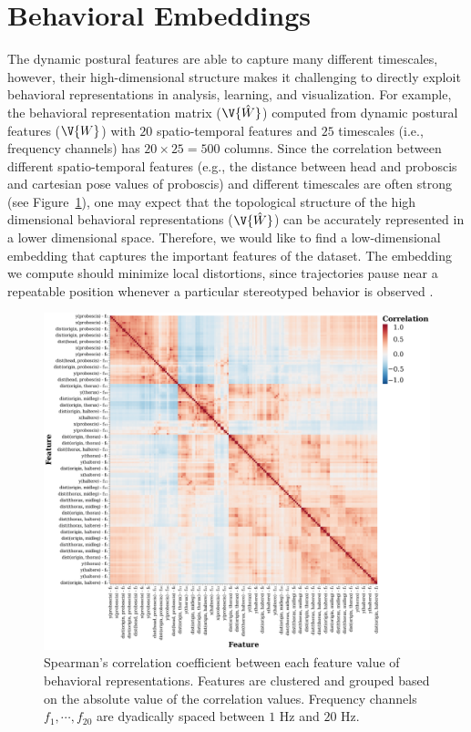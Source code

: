 \section{Behavioral Embeddings}\label{section:behavioral-embeddings}
The dynamic postural features are able to capture many different timescales, however, their high-dimensional structure makes it challenging to directly exploit behavioral representations in analysis, learning, and visualization.
For example, the behavioral representation matrix ($\V{\hat{W}}$) computed from dynamic postural features ($\V{W}$) with $20$ spatio-temporal features and $25$ timescales (i.e., frequency channels) has $20 \times 25 {=} 500$ columns.
Since the correlation between different spatio-temporal features (e.g., the distance between head and proboscis and cartesian pose values of proboscis) and different timescales are often strong (see Figure~\ref{figure:correlations-btw-features}), one may expect that the topological structure of the high dimensional behavioral representations ($\V{\hat{W}}$) can be accurately represented in a lower dimensional space.
Therefore, we would like to find a low-dimensional embedding that captures the important features of the dataset.
The embedding we compute should minimize local distortions, since trajectories pause near a repeatable position whenever a particular stereotyped behavior is observed \citep{berman_mapping_2014, deangelis_manifold_2019, ali_timecluster_2019}.

\begin{figure}[ht!]
	\centering
	\includegraphics[width=0.70\linewidth]{figures/FeatureCorrelations-FlyF1DAnn-XY_labels.pdf}
	\caption[Spearman's correlation coefficient between each feature value of behavioral representations.]{Spearman's correlation coefficient between each feature value of behavioral representations. Features are clustered and grouped based on the absolute value of the correlation values. Frequency channels $f_1, \cdots, f_{20}$ are dyadically spaced between $1$ Hz and $20$ Hz. \label{figure:correlations-btw-features}}
\end{figure}


